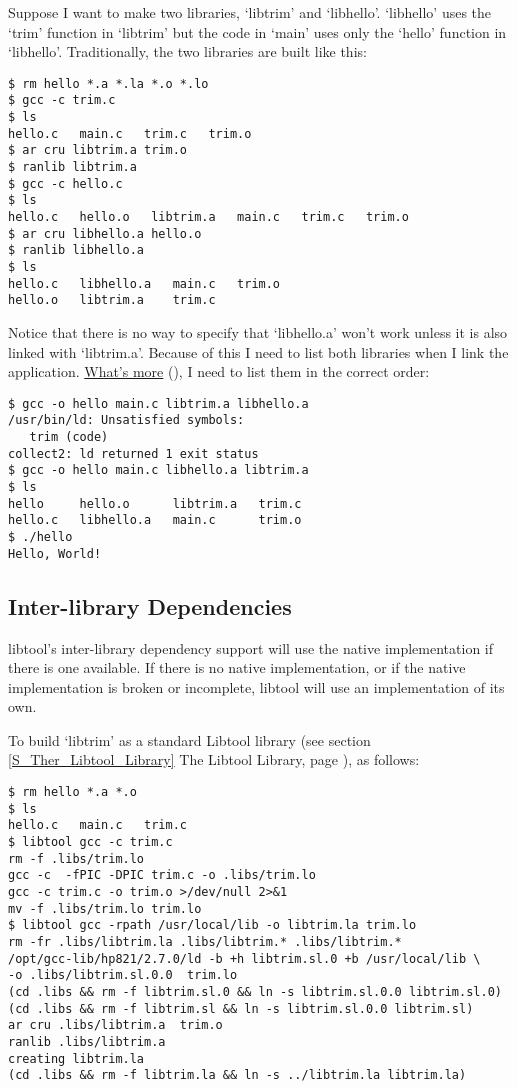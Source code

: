  Suppose I want to make two libraries, `libtrim' and `libhello'. `libhello' uses the `trim' function in `libtrim' but the code in `main' uses only the `hello' function in `libhello'. Traditionally, the two libraries are built like this: 

\begin{Verbatim}
$ rm hello *.a *.la *.o *.lo
$ gcc -c trim.c
$ ls
hello.c   main.c   trim.c   trim.o
$ ar cru libtrim.a trim.o
$ ranlib libtrim.a
$ gcc -c hello.c
$ ls
hello.c   hello.o   libtrim.a   main.c   trim.c   trim.o
$ ar cru libhello.a hello.o
$ ranlib libhello.a
$ ls
hello.c   libhello.a   main.c   trim.o
hello.o   libtrim.a    trim.c
\end{Verbatim}

 Notice that there is no way to specify that `libhello.a' won't work unless it is also linked with `libtrim.a'. Because of this I need to list both libraries when I link the application. \underline{What's more} ({\McQ{}}), I need to list them in the correct order: 

\begin{Verbatim}
$ gcc -o hello main.c libtrim.a libhello.a
/usr/bin/ld: Unsatisfied symbols:
   trim (code)
collect2: ld returned 1 exit status
$ gcc -o hello main.c libhello.a libtrim.a
$ ls
hello     hello.o      libtrim.a   trim.c
hello.c   libhello.a   main.c      trim.o
$ ./hello
Hello, World!
\end{Verbatim}

\subsection{Inter-library Dependencies}\label{SS_Inter-library_Dependencies}

libtool's inter-library dependency support will use the native implementation if there is one available. If there is no native implementation, or if the native implementation is broken or incomplete, libtool will use an implementation of its own. 


To build `libtrim' as a standard Libtool library (see
section \ref{S_Ther_Libtool_Library} The Libtool Library, page
\pageref{S_Ther_Libtool_Library}), as follows: 

\begin{Verbatim}
$ rm hello *.a *.o
$ ls
hello.c   main.c   trim.c
$ libtool gcc -c trim.c
rm -f .libs/trim.lo
gcc -c  -fPIC -DPIC trim.c -o .libs/trim.lo
gcc -c trim.c -o trim.o >/dev/null 2>&1
mv -f .libs/trim.lo trim.lo
$ libtool gcc -rpath /usr/local/lib -o libtrim.la trim.lo
rm -fr .libs/libtrim.la .libs/libtrim.* .libs/libtrim.*
/opt/gcc-lib/hp821/2.7.0/ld -b +h libtrim.sl.0 +b /usr/local/lib \
-o .libs/libtrim.sl.0.0  trim.lo
(cd .libs && rm -f libtrim.sl.0 && ln -s libtrim.sl.0.0 libtrim.sl.0)
(cd .libs && rm -f libtrim.sl && ln -s libtrim.sl.0.0 libtrim.sl)
ar cru .libs/libtrim.a  trim.o
ranlib .libs/libtrim.a
creating libtrim.la
(cd .libs && rm -f libtrim.la && ln -s ../libtrim.la libtrim.la)
\end{Verbatim}

